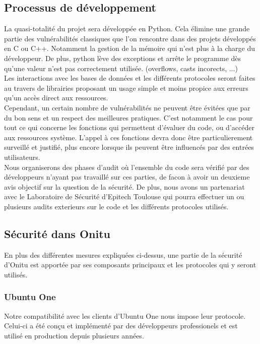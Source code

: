 \subsection{Processus de développement}

La quasi-totalité du projet sera développée en Python. Cela élimine une grande partie des vulnérabilités classiques que l'on rencontre dans des projets développés en C ou C++. Notamment la gestion de la mémoire qui n'est plus à la charge du développeur. De plus, python lève des exceptions et arrête le programme dès qu'une valeur n'est pas correctement utilisée. (overflows, casts incorects, ...)\\

Les interactions avec les bases de données et les différents protocoles seront faites au travers de librairies proposant un usage simple et moins propice aux erreurs qu'un accès direct aux ressources.\\

Cependant, un certain nombre de vulnérabilités ne peuvent être évitées que par du bon sens et un respect des meilleures pratiques. C'est notamment le cas pour tout ce qui concerne les fonctions qui permettent d'évaluer du code, ou d'accéder aux ressources système. L'appel à ces fonctions devra donc être particulierement surveillé et justifié, plus encore lorsque ils peuvent être influencés par des entrées utilisateurs.\\

Nous organiserons des phases d'audit où l'ensemble du code sera vérifié par des développeurs n'ayant pas travaillé sur ces parties, de facon à avoir un deuxieme avis objectif sur la question de la sécurité. De plus, nous avons un partenariat avec le Laboratoire de Sécurité d'Epitech Toulouse qui pourra effectuer un ou plusieurs audits exterieurs sur le code et les différents protocoles utilisés.

\subsection{Sécurité dans Onitu}

En plus des différentes mesures expliquées ci-dessus, une partie de la sécurité d'Onitu est apportée par ses composants principaux et les protocoles qui y seront utilisés.

\subsubsection{Ubuntu One}
Notre compatibilité avec les clients d'Ubuntu One nous impose leur protocole. Celui-ci a été conçu et implémenté par des développeurs professionels et est utilisé en production depuis plusieurs années.\\

